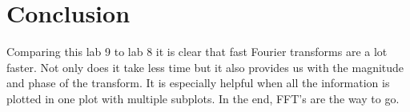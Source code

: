 \documentclass[12pt]{article}
\begin{document}
\section{Conclusion}
Comparing this lab 9 to lab 8 it is clear that fast Fourier transforms are a lot faster. Not only does it take less time but it also provides us with the magnitude and phase of the transform. It is especially helpful when all the information is plotted in one plot with multiple subplots. In the end, FFT's are the way to go.
\end{document}
